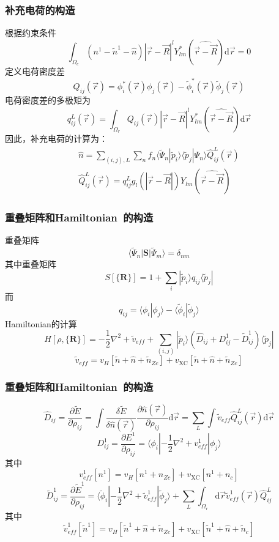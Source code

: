 {\frame
{
	\frametitle{补充电荷的构造}
	根据约束条件
	\begin{displaymath}
		\int_{\Omega_c}(n^1-\tilde n^1-\hat n)|\vec r-\vec R|^lY_{lm}^{\ast}(\widehat{\vec r-\vec R})\mathrm{d}\vec r=0
	\end{displaymath}
	定义电荷密度差
	\begin{displaymath}
		Q_{ij}(\vec r)=\phi_i^{\ast}(\vec r)\phi_j(\vec r)-\tilde\phi_i^{\ast}(\vec r)\tilde\phi_j(\vec r)
	\end{displaymath}
	电荷密度差的多极矩为
	\begin{displaymath}
		q_{ij}^L(\vec r)=\int_{\Omega_r}Q_{ij}(\vec r)|\vec r-\vec R|^lY_{lm}^{\ast}(\widehat{\vec r-\vec R})\mathrm{d}\vec r
	\end{displaymath}
	因此，补充电荷的计算为：
	\begin{displaymath}
		\begin{aligned}
			\hat n=\sum_{(i,j),L}\sum_n f_n\langle\tilde\Psi_n|\tilde p_i\rangle\langle\tilde p_j|\Psi_n\rangle\hat Q_{ij}^L(\vec r)\\
			\hat Q_{ij}^L(\vec r)=q_{ij}^Lg_l(|\vec r-\vec R|)Y_{lm}(\widehat{\vec r-\vec R})
		\end{aligned}
	\end{displaymath}
}

\frame
{
	\frametitle{重叠矩阵和\textrm{Hamiltonian~}的构造}
重叠矩阵
	\begin{displaymath}
		\langle\tilde\Psi_n|\mathbf{S}|\tilde\Psi_m\rangle=\delta_{nm}
	\end{displaymath}
	其中重叠矩阵$$S[\{\mathbf{R}\}]=1+\sum_i|\tilde p_i\rangle q_{ij}\langle\tilde p_j|$$
	而$$q_{ij}=\langle\phi_i|\phi_j\rangle-\langle\tilde\phi_i|\tilde\phi_j\rangle$$
	\textrm{Hamiltonian}的计算
	\begin{displaymath}
		H[\rho,\{\mathbf{R}\}]=-\dfrac12\nabla^2+\tilde v_{e\!f\!f}+\sum_{(i,j)}|\tilde p_i\rangle(\hat D_{ij}+D_{ij}^1-\tilde D_{ij}^1)\langle\tilde p_j|	
	\end{displaymath}
	$$\tilde v_{e\!f\!f}=v_H[\tilde n+\hat n+\tilde n_{Zc}]+v_{\mathrm{XC}}[\tilde n+\hat n+\tilde n_{Zc}]$$
}

\frame
{
	\frametitle{重叠矩阵和\textrm{Hamiltonian~}的构造}
	$$\hat D_{ij}=\dfrac{\partial\tilde E}{\partial\rho_{ij}}=\int\dfrac{\delta\tilde E}{\delta\hat n(\vec  r)}\dfrac{\partial\hat n(\vec r)}{\partial\rho_{ij}}\mathrm{d}\vec r=\sum_{L}\int\tilde v_{e\!f\!f}\hat Q_{ij}^L(\vec r)\mathrm{d}\vec r$$
	$$D_{ij}^1=\dfrac{\partial E^1}{\partial\rho_{ij}}=\langle\phi_i|-\dfrac12\nabla^2+v_{e\!f\!f}^1|\phi_j\rangle$$
	其中$$v_{e\!f\!f}^1[n^1]=v_H[n^1+n_{Zc}]+v_{\mathrm{XC}}[n^1+n_c]$$
	$$\tilde D_{ij}^1=\dfrac{\partial\tilde E^1}{\partial\rho_{ij}}=\langle\tilde\phi_i|-\dfrac12\nabla^2+\tilde v_{e\!f\!f}^1|\tilde\phi_j\rangle+\sum_L\int_{\Omega_r}\mathrm{d}\vec r\tilde v_{e\!f\!f}^1(\vec r)\hat Q_{ij}^L$$
	其中$$\tilde v_{e\!f\!f}^1[\tilde n^1]=v_H[\tilde n^1+\hat n+\tilde n_{Zc}]+v_{\mathrm{XC}}[\tilde n^1+\hat n+\tilde n_c]$$
}

}
